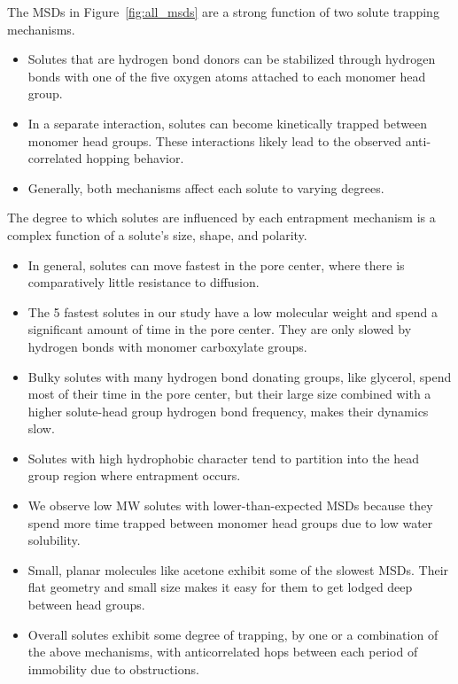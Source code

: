 \documentclass{article}
\begin{document}
  \noindent The MSDs in Figure~\ref{fig:all_msds} are a strong function of two solute 
  trapping mechanisms. %
  \begin{itemize}
  	\item Solutes that are hydrogen bond donors can be stabilized through hydrogen bonds
  	with one of the five oxygen atoms attached to each monomer head group. 
  	\item In a separate interaction, solutes can become kinetically trapped between 
  	monomer head groups. These interactions likely lead to the observed anti-correlated
  	hopping	behavior.
  	\item Generally, both mechanisms affect each solute to varying degrees.
  \end{itemize}
  
  
  \noindent The degree to which solutes are influenced by each entrapment mechanism
  is a complex function of a solute's size, shape, and polarity.
  \begin{itemize}
    \item In general, solutes can move fastest in the pore center, where
    there is comparatively little resistance to diffusion.
	\item The 5 fastest solutes in our study have a low molecular weight and
	spend a significant amount of time in the pore center. They are only slowed
	by hydrogen bonds with monomer carboxylate groups.
	\item Bulky solutes with many hydrogen bond donating groups, like glycerol,
	spend most of their time in the pore center, but their large size combined
	with a higher solute-head group hydrogen bond frequency, makes their dynamics slow. 
    \item Solutes with high hydrophobic character tend to partition into the 
    head group region where entrapment occurs.
    \item We observe low MW solutes with lower-than-expected MSDs because they
    spend more time trapped between monomer head groups due to low water
    solubility.
    \item Small, planar molecules like acetone exhibit some of the slowest MSDs.
    Their flat geometry and small size makes it easy for them to get lodged deep
    between head groups.
  	\item Overall solutes exhibit some degree of trapping, by one or a combination of the above
  	mechanisms, with anticorrelated hops between each period of immobility due to 
  	obstructions.
  \end{itemize}
  
\end{document}
